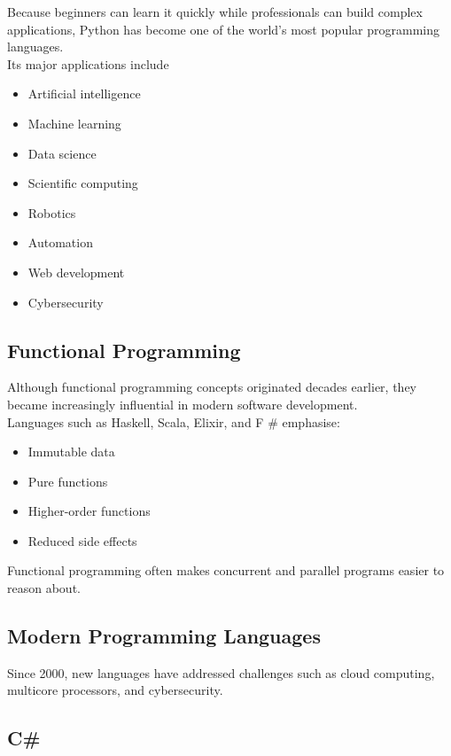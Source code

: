 Because beginners can learn it quickly while professionals can build complex applications, Python has become one of the world's most popular programming languages.\\

Its major applications include

\begin{itemize}
    \item Artificial intelligence
    \item Machine learning
    \item Data science
    \item Scientific computing
    \item Robotics
    \item Automation
    \item Web development
    \item Cybersecurity
\end{itemize}

\subsection{Functional Programming}

Although functional programming concepts originated decades earlier, they became increasingly influential in modern software development.\\

Languages such as Haskell, Scala, Elixir, and F \# emphasise:

\begin{itemize}
    \item Immutable data
    \item Pure functions
    \item Higher-order functions
    \item Reduced side effects
\end{itemize}

Functional programming often makes concurrent and parallel programs easier to reason about.

\subsection{Modern Programming Languages}

Since 2000, new languages have addressed challenges such as cloud computing, multicore processors, and cybersecurity.

\subsection{C\#}

